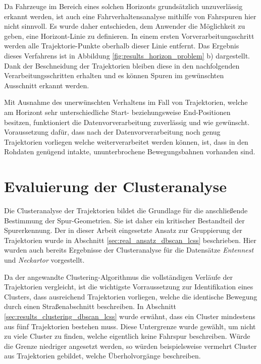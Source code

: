 Da Fahrzeuge im Bereich eines solchen Horizonts grundsätzlich unzuverlässig erkannt werden, ist auch eine Fahrverhaltensanalyse
mithilfe von Fahrspuren hier nicht sinnvoll. Es wurde daher entschieden, dem Anwender die Möglichkeit zu geben, eine
Horizont-Linie zu definieren. In einem ersten Vorverarbeitungsschritt werden alle Trajektorie-Punkte oberhalb dieser
Linie entfernt. Das Ergebnis dieses Verfahrens ist in Abbildung \ref{fig:results_horizon_problem} b)
dargestellt. Dank der Beschneidung der Trajektorien bleiben diese in den nachfolgenden Verarbeitungsschritten
erhalten und es können Spuren im gewünschten Ausschnitt erkannt werden.

Mit Ausnahme des unerwünschten Verhaltens im Fall von Trajektorien, welche am Horizont sehr unterschiedliche Start-
beziehungsweise End-Positionen besitzen, funktioniert die Datenvorverarbeitung zuverlässig und wie gewünscht.
Voraussetzung dafür, dass nach der Datenvorverarbeitung
noch genug Trajektorien vorliegen welche weiterverarbeitet werden können, ist, dass in
den Rohdaten genügend intakte, ununterbrochene Bewegungsbahnen vorhanden sind.

\section{Evaluierung der Clusteranalyse}
\label{sec:results_eval_clustering}

Die Clusteranalyse der Trajektorien bildet die Grundlage für die anschließende Bestimmung der Spur-Geometrien.
Sie ist daher ein kritischer Bestandteil der Spurerkennung. Der in dieser Arbeit eingesetzte Ansatz zur
Gruppierung der Trajektorien wurde in Abschnitt \ref{sec:real_ansatz_dbscan_lcss} beschrieben.
Hier wurden auch bereits Ergebnisse der Clusteranalyse für die Datensätze \textit{Entennest} und
\textit{Neckartor} vorgestellt.

Da der angewandte Clustering-Algorithmus die vollständigen Verläufe der
Trajektorien vergleicht, ist die wichtigste Vorraussetzung zur Identifikation eines Clusters, dass ausreichend
Trajektorien vorliegen, welche die identische Bewegung durch einen Straßenabschnitt beschreiben.
In Abschnitt \ref{sec:results_clustering_dbscan_lcss} wurde erwähnt, dass ein Cluster mindestens aus
fünf Trajektorien bestehen muss. Diese Untergrenze wurde gewählt, um nicht zu viele Cluster zu finden, welche
eigentlich keine Fahrspur beschreiben. Würde die Grenze niedriger angesetzt werden, so würden beispielsweise
vermehrt Cluster aus Trajektorien gebildet, welche Überholvorgänge beschreiben.

